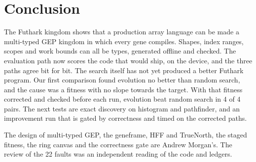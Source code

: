 \documentclass[sigconf,nonacm]{acmart}
\begin{document}
\section{Conclusion}
The Futhark kingdom shows that a production array language can be made a
multi-typed GEP kingdom in which every gene compiles. Shapes, index ranges,
scopes and work bounds can all be types, generated offline and checked. The
evaluation path now scores the code that would ship, on the device, and the three
paths agree bit for bit. The search itself has not yet produced a better
Futhark program. Our first comparison found evolution no better than random
search, and the cause was a fitness with no slope towards the target. With that
fitness corrected and checked before each run, evolution beat random search in
4 of 4 pairs. The next tests are exact discovery on histogram and pathfinder,
and an improvement run that is gated by correctness and timed on the corrected
paths.

\begin{acks}
The design of multi-typed GEP, the geneframe, HFF and TrueNorth, the staged
fitness, the ring canvas and the correctness gate are Andrew Morgan's. The review
of the 22 faults was an independent reading of the code and ledgers.
\end{acks}



\end{document}
